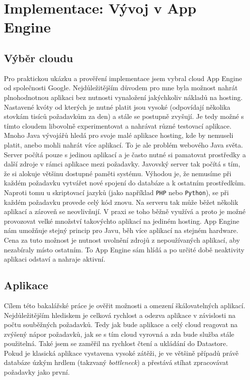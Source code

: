 \chapter{Implementace: Vývoj v App Engine}

\section{Výběr cloudu}
Pro praktickou ukázku a prověření implementace jsem vybral cloud App Engine od společnosti Google. Nejdůležitějším důvodem pro mne byla možnost nahrát plnohodnotnou aplikaci bez nutnosti vynaložení jakýchkoliv nákladů na hosting. Nastavené kvóty od kterých je nutné platit jsou vysoké (odpovídají několika stovkám tisíců požadavkům za den) a stále se postupně zvyšují. Je tedy možné s tímto cloudem libovolně experimentovat a nahrávat různé testovací aplikace. Mnoho Java vývojářů hledá pro svoje malé aplikace hosting, kde by nemuseli platit, anebo mohli nahrát více aplikací. To je ale problém webového Java světa. Server počítá pouze s jedinou aplikací a je často nutné si pamatovat prostředky a další zdroje v rámci aplikace mezi požadavky. Javovský server tak počítá s tím, že si alokuje většinu dostupné paměti systému. Výhodou je, že nemusíme při každém požadavku vytvářet nové spojení do databáze a k ostatním prostředkům. Naproti tomu u skriptovací jazyků (jako například \verb|PHP| nebo \verb|Python|), se při každém požadavku provede celý kód znovu. Na serveru tak může běžet několik aplikací a zároveň se neovlivňují. V praxi se toho běžně využívá a proto je možné provozovat velké množství takovýchto aplikací na jediném hosting. App Engine nám umožňuje stejný princip pro Javu, běh více aplikací na stejném hardware. Cena za tuto možnost je nutnost uvolnění zdrojů z nepoužívaných aplikací, aby nezabíraly místo ostatním. To App Engine sám hlídá a po určité době neaktivity aplikaci odstaví a nahraje aktivní.

\section{Aplikace}
Cílem této bakalářské práce je ověřit možnosti a omezení škálovatelných aplikací. Nejdůležitějším hlediskem je celková rychlost a odezva aplikace v závislosti na počtu souběžných požadavků. Tedy jak bude aplikace a celý cloud reagovat na zvýšený nápor požadavků, jak se s tím cloud vyrovná a zda bude služba stále použitelná. Také jsem se zaměřil na rychlost čtení a ukládání do Datastore. Pokud je klasická aplikace vystavena vysoké zátěži, je ve většině případů právě databáze úzkým hrdlem (takzvaný \emph{bottleneck}) a přestává stíhat zpracovávat požadavky jako první. 

